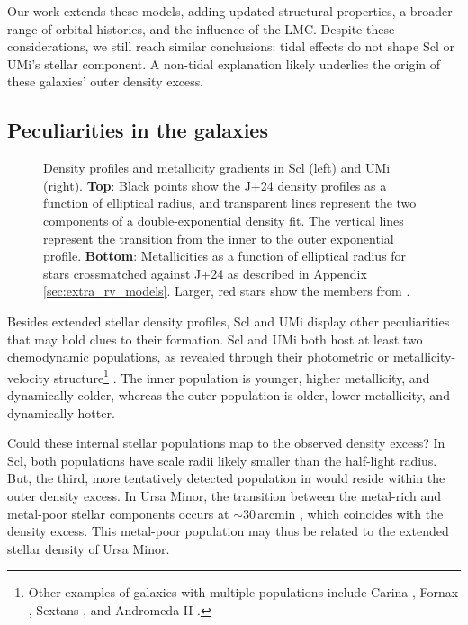 Our work extends these models, adding updated structural properties, a
broader range of orbital histories, and the influence of the LMC.
Despite these considerations, we still reach similar conclusions: tidal
effects do not shape Scl or UMi's stellar component. A non-tidal
explanation likely underlies the origin of these galaxies' outer density
excess.

\subsection{Peculiarities in the galaxies}\label{sec:peculiarities}

\begin{figure}
\centering
{}
\caption[Metallicity gradients in Sculptor and Ursa Minor]{Density
profiles and metallicity gradients in Scl (left) and UMi (right).
\textbf{Top}: Black points show the J+24 density profiles as a function
of elliptical radius, and transparent lines represent the two components
of a double-exponential density fit. The vertical lines represent the
transition from the inner to the outer exponential profile.
\textbf{Bottom}: Metallicities as a function of elliptical radius for
stars crossmatched against J+24 as described in Appendix
\ref{sec:extra_rv_models}. Larger, red stars show the members from
\citet{sestito+2023a, sestito+2023b}.}\label{fig:metallicity_gradients}
\end{figure}

Besides extended stellar density profiles, Scl and UMi display other
peculiarities that may hold clues to their formation. Scl and UMi both
host at least two chemodynamic populations, as revealed through their
photometric or metallicity-velocity structure\footnote{Other examples of
  galaxies with multiple populations include Carina
  \citep{battaglia+2012, fabrizio+2016, kordopatis+2016}, Fornax
  \citep{battaglia+2006, amorisco+evans2012, delpino+aparicio+hidalgo2015},
  Sextans
  \citep{battaglia+2011, cicuendez+battaglia2018, roederer+2023}, and
  Andromeda II
  \citep{mcconnachie+arimoto+irwin2007, ho+2012, delpino+2017}.}
\citep{tolstoy+2004, battaglia+2008, pace+2020}. The inner population is
younger, higher metallicity, and dynamically colder, whereas the outer
population is older, lower metallicity, and dynamically hotter.

Could these internal stellar populations map to the observed density
excess? In Scl, both populations have scale radii likely smaller than
the half-light radius. But, the third, more tentatively detected
population in \citet{arroyo-polonio+2024} would reside within the outer
density excess. In Ursa Minor, the transition between the metal-rich and
metal-poor stellar components occurs at \(\sim 30\,\)arcmin
\citep{pace+2020}, which coincides with the density excess. This
metal-poor population may thus be related to the extended stellar
density of Ursa Minor.

